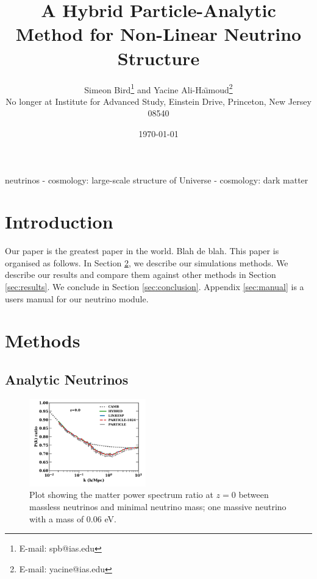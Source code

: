 \documentclass[useAMS, usenatbib]{mnras}
\title{A Hybrid Particle-Analytic Method for Non-Linear Neutrino Structure}
\author[ S. Bird and Y. Ali-Ha\"{\i}moud]{
  Simeon Bird\thanks{E-mail: spb@ias.edu} and Yacine Ali-Ha\"{\i}moud\thanks{E-mail: yacine@ias.edu}\vspace{1.5mm}\\
No longer at Institute for Advanced Study, Einstein Drive, Princeton, New Jersey 08540}
\begin{document}
\date{\today}

\pagerange{\pageref{firstpage}--\pageref{lastpage}} 
\label{firstpage}

\maketitle

\begin{abstract}
\end{abstract}

\begin{keywords}
        neutrinos - cosmology: large-scale structure of Universe - cosmology: dark matter
\end{keywords}

\section{Introduction}

Our paper is the greatest paper in the world. Blah de blah.
This paper is organised as follows. In Section \ref{sec:methods},
we describe our simulations methods. We describe our
results and compare them against other methods
in Section \ref{sec:results}. We conclude in Section \ref{sec:conclusion}.
Appendix \ref{sec:manual} is a users manual for our neutrino module.
\cite{AHB}

\section{Methods}
\label{sec:methods}

\subsection{Analytic Neutrinos}
\label{sec:analytic}

\begin{figure}
\includegraphics[width=0.45\textwidth]{nuplots/pks_rel-10.pdf}
\caption{Plot showing the matter power spectrum ratio at $z=0$ between massless neutrinos and minimal neutrino mass; one massive neutrino with a mass of $0.06$ eV.
}
  \label{fig:minimal_mass}
\end{figure}
\end{document}
